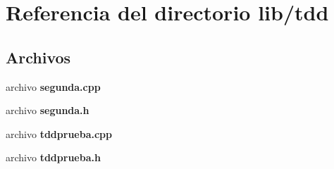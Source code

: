 \section{Referencia del directorio lib/tdd}
\label{dir_f5d10243007504f24d79741f94a4d999}
\subsection*{Archivos}
\begin{DoxyCompactItemize}
\item 
archivo {\bf segunda.\+cpp}
\item 
archivo {\bf segunda.\+h}
\item 
archivo {\bf tddprueba.\+cpp}
\item 
archivo {\bf tddprueba.\+h}
\end{DoxyCompactItemize}

